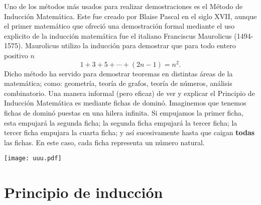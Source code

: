 \noindent
\begin{minipage}[c]{0.7\textwidth}
    Uno de los métodos más usados para realizar demostraciones es el Método de Inducción Matemática. Este fue creado por Blaise Pascal en el siglo XVII, aunque el primer matemático que ofreció una demostración formal mediante el uso explicito de la inducción matemática fue el italiano Franciscus Maurolicus (1494-1575). Maurolicus utilizo la inducción para demostrar que para todo entero positivo $n$
    \[1+3+5+\cdots +(2n-1)=n^2.\]
    Dicho método ha servido para demostrar teoremas en distintas áreas de la matemática; como: geometría, teoría de grafos, teoría de números, análisis combinatorio. Una manera informal (pero eficaz) de ver y explicar el Principio de Inducción Matemática es mediante fichas de dominó. Imaginemos que tenemos fichas de dominó puestas en una hilera infinita. Si empujamos la primer ficha, esta empujará la segunda ficha; la segunda ficha empujará la tercer ficha; la tercer ficha empujara la cuarta ficha; y así sucesivamente hasta que caigan \textbf{todas} las fichas. En este caso, cada ficha representa un número natural.
\end{minipage}
\begin{minipage}[c]{0.24\textwidth}
    \noindent
    \texttt{[image: uuu.pdf]}
\end{minipage}

\newpage

\section{Principio de inducción}

